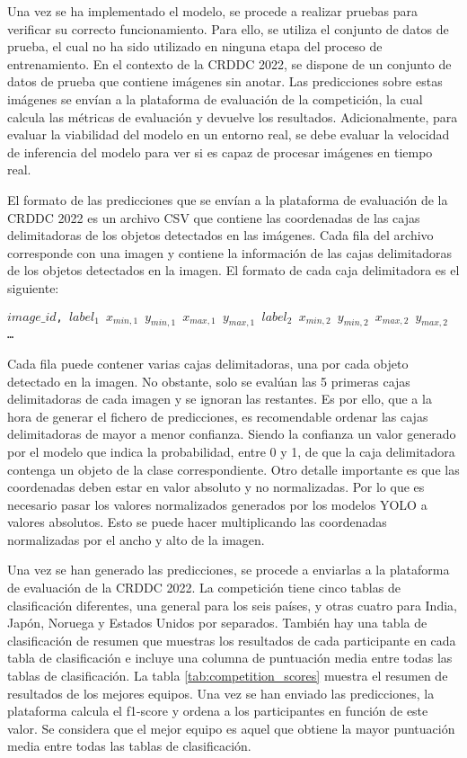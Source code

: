 Una vez se ha implementado el modelo, se procede a realizar pruebas para verificar su correcto funcionamiento. Para ello, se utiliza el conjunto de datos de prueba, el cual no ha sido utilizado en ninguna etapa del proceso de entrenamiento. En el contexto de la CRDDC 2022, se dispone de un conjunto de datos de prueba que contiene imágenes sin anotar. Las predicciones sobre estas imágenes se envían a la plataforma de evaluación de la competición, la cual calcula las métricas de evaluación y devuelve los resultados. Adicionalmente, para evaluar la viabilidad del modelo en un entorno real, se debe evaluar la velocidad de inferencia del modelo para ver si es capaz de procesar imágenes en tiempo real.

El formato de las predicciones que se envían a la plataforma de evaluación de la CRDDC 2022 es un archivo CSV que contiene las coordenadas de las cajas delimitadoras de los objetos detectados en las imágenes. Cada fila del archivo corresponde con una imagen y contiene la información de las cajas delimitadoras de los objetos detectados en la imagen. El formato de cada caja delimitadora es el siguiente:

\begin{center}
    \texttt{\(image\_id\), \(label_{1}\) \(x_{min, 1}\) \(y_{min, 1}\) \(x_{max, 1}\) \(y_{max, 1}\) \(label_{2}\) \(x_{min, 2}\) \(y_{min, 2}\) \(x_{max, 2}\) \(y_{max, 2}\) \dots}
\end{center}

Cada fila puede contener varias cajas delimitadoras, una por cada objeto detectado en la imagen. No obstante, solo se evalúan las 5 primeras cajas delimitadoras de cada imagen y se ignoran las restantes. Es por ello, que a la hora de generar el fichero de predicciones, es recomendable ordenar las cajas delimitadoras de mayor a menor confianza. Siendo la confianza un valor generado por el modelo que indica la probabilidad, entre 0 y 1, de que la caja delimitadora contenga un objeto de la clase correspondiente. Otro detalle importante es que las coordenadas deben estar en valor absoluto y no normalizadas. Por lo que es necesario pasar los valores normalizados generados por los modelos YOLO a valores absolutos. Esto se puede hacer multiplicando las coordenadas normalizadas por el ancho y alto de la imagen.

Una vez se han generado las predicciones, se procede a enviarlas a la plataforma de evaluación de la CRDDC 2022. La competición tiene cinco tablas de clasificación diferentes, una general para los seis países, y otras cuatro para India, Japón, Noruega y Estados Unidos por separados. También hay una tabla de clasificación de resumen que muestras los resultados de cada participante en cada tabla de clasificación e incluye una columna de puntuación media entre todas las tablas de clasificación. La tabla \ref{tab:competition_scores} muestra el resumen de resultados de los mejores equipos. Una vez se han enviado las predicciones, la plataforma calcula el f1-score y ordena a los participantes en función de este valor. Se considera que el mejor equipo es aquel que obtiene la mayor puntuación media entre todas las tablas de clasificación.


